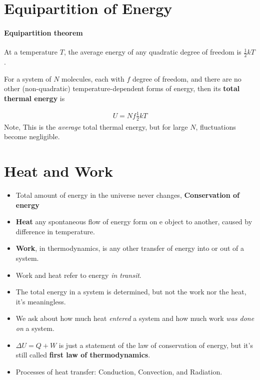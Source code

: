 \documentclass{book}
\begin{document}
\section{Equipartition of Energy}%
\label{sec:equi of energy}

\paragraph{Equipartition theorem} At a temperature $T$, the average energy of any
quadratic degree of freedom is $\frac{1}{2}kT$.

For a system of $N$ molecules, each with $f$ degree of freedom, and there are no other
(non-quadratic) temperature-dependent forms of energy, then its \textbf{total thermal energy} is

\begin{align}
U = Nf \frac{1}{2}kT
\end{align}
Note, This is the \textit{average} total thermal energy,
but for large $N$, fluctuations become negligible.


\section{Heat and Work}%
\label{sec:heat and work}

\begin{itemize}
  \item Total amount of energy in the universe never changes, \textbf{Conservation of energy}
  \item \textbf{Heat} any spontaneous flow of energy form on e object to another, caused by
        difference in temperature.
  \item \textbf{Work}, in thermodynamics, is any other transfer of energy into or out of a system.
  \item Work and heat refer to energy \textit{in transit}.
  \item The total energy in a system is determined, but not the work nor the heat, it's meaningless.
  \item We ask about how much heat \textit{entered} a system and how much work
        \textit{was done on} a system.
  \item $\Delta{U} = Q + W$
        is just a statement of the law of conservation of energy, but it's still called
        \textbf{first law of thermodynamics}.
  \item Processes of heat transfer: Conduction, Convection, and Radiation.
\end{itemize}
\end{document}
